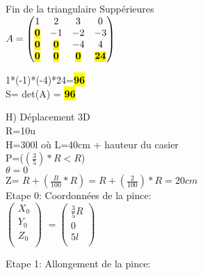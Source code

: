 \vspace{5mm} %
Fin de la triangulaire Suppérieures \\

$
A =
\begin{pmatrix}
  1 & 2 & 3 & 0    \\
  \hl{\textbf{0}} & -1 & -2 & -3 \\
  \hl{\textbf{0}} & \hl{\textbf{0}} & -4 & 4   \\
  \hl{\textbf{0}} & \hl{\textbf{0}} & \hl{\textbf{0}} & \hl{\textbf{24}}  \\
\end{pmatrix}
$

\vspace{5mm} %

1*(-1)*(-4)*24=\hl{\textbf{96}} \\
\vspace{4mm} %
S= det(A) = \hl{\textbf{96}} \\


\vspace{15mm} %

H) Déplacement 3D \\

R=10u\\
H=300l où L=40cm + hauteur du casier\\
P=($(\frac{3}{5})* R<R$)\\
$\theta =0$\\
Z= $R+(\frac{B}{100}*R) = R+(\frac{2}{100})*R=20cm $\\

Etape 0: Coordonnées de la pince: \\

$
\begin{pmatrix}
  X_{0} \\
  Y_{0} \\
  Z_{0} \\
\end{pmatrix}
$
\vspace{5mm} %
$
=
\begin{pmatrix}
  \frac{3}{5}R \\
  0 \\
  5l \\
\end{pmatrix}
$

Etape 1: Allongement de la pince: \\

